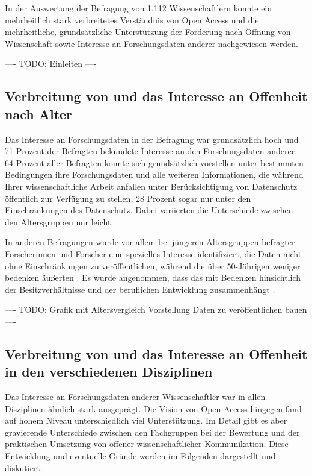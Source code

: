 In der Auswertung der Befragung von 1.112 Wissenschaftlern konnte ein mehrheitlich stark verbreitetes Verständnis von Open Access und die mehrheitliche, grundsätzliche Unterstützung der Forderung nach Öffnung von Wissenschaft sowie Interesse an Forschungsdaten anderer nachgewiesen werden.

---- TODO: Einleiten ----

\subsection{Verbreitung von und das Interesse an Offenheit nach Alter}

Das Interesse an Forschungsdaten in der Befragung war grundsätzlich hoch und 71 Prozent der Befragten bekundete Interesse an den Forschungsdaten anderer. 64 Prozent aller Befragten konnte sich grundsätzlich vorstellen unter bestimmten Bedingungen ihre Forschungsdaten und alle weiteren Informationen, die während Ihrer wissenschaftliche Arbeit anfallen unter Berücksichtigung von Datenschutz öffentlich zur Verfügung zu stellen, 28 Prozent sogar nur unter den Einschränkungen des Datenschutz. Dabei variierten die Unterschiede zwischen den Altersgruppen nur leicht.

In anderen Befragungen wurde vor allem bei jüngeren Altersgruppen befragter Forscherinnen und Forscher eine spezielles Interesse identifiziert, die Daten nicht ohne Einschränkungen zu veröffentlichen, während die über 50-Jährigen weniger bedenken äußerten \cite{Tenopir_2011}. Es wurde angenommen, dass das mit Bedenken hinsichtlich der Besitzverhältnisse und der beruflichen Entwicklung zusammenhängt \cite{Tenopir_2011}.

---- TODO: Grafik mit Altersvergleich Vorstellung Daten zu veröffentlichen bauen  ----


\subsection{Verbreitung von und das Interesse an Offenheit in den verschiedenen Disziplinen}

Das Interesse an Forschungsdaten anderer Wissenschaftler war in allen Disziplinen ähnlich stark ausgeprägt. Die Vision von Open Access hingegen fand auf hohem Niveau unterschiedlich viel Unterstützung. Im Detail gibt es aber gravierende Unterschiede zwischen den Fachgruppen bei der Bewertung und der praktischen Umsetzung von offener wissenschaftlicher Kommunikation. Diese Entwicklung und eventuelle Gründe werden im Folgenden dargestellt und diskutiert.

